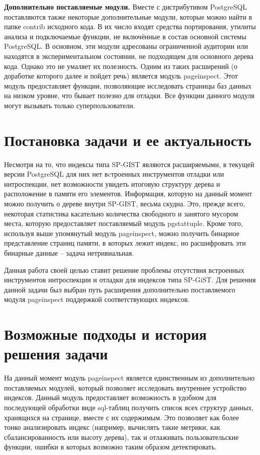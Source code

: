\documentclass[12pt,oneside]{amsart}
\begin{document}
\textbf{Дополнительно поставляемые модули.} Вместе с дистрибутивом PostgreSQL поставляются также некоторые дополнительные модули, которые можно найти в папке contrib исходного кода. В их число входят средства портирования, утилиты анализа и подключаемые функции, не включённые в состав основной системы PostgreSQL. В основном, эти модули адресованы ограниченной аудитории или находятся в экспериментальном состоянии, не подходящем для основного дерева кода. Однако это не умаляет их полезность. Одним из таких расширений (о доработке которого далее и пойдет речь) является модуль pageinspect. Этот модуль предоставляет функции, позволяющие исследовать страницы баз данных на низком уровне, что бывает полезно для отладки. Все функции данного модуля могут вызывать только суперпользователи.

\section{Постановка задачи и ее актуальность}

Несмотря на то, что индексы типа SP-GIST являются расширяемыми, в текущей версии PostgreSQL для них нет вcтроенных инструментов отладки или интроспекции, нет возможности увидеть итоговую структуру дерева и расположение в памяти его элементов. Информация, которую на данный момент можно получить о дереве внутри SP-GIST, весьма скудна. Это, прежде всего, некоторая статистика касательно количества свободного и занятого мусором места, которую предоставляет поставляемый модуль pgstattuple. Кроме того, используя выше упомянутый модуль pageinspect, можно получить бинарное представление страниц памяти, в которых лежит индекс, но расшифровать эти бинарные данные -- задача нетривиальная.

Данная работа своей целью ставит решение проблемы отсутствия встроенных инструментов интроспекции и отладки для индексов типа SP-GiST. Для решения данной задачи был выбран путь расширения дополнительно поставляемого модуля pageinspect поддержкой соответствующих индексов.

\section{Возможные подходы и история решения задачи}

На данный момент модуль pageinspect является единственным из дополнительно поставляемых модулей, который позволяет исследовать внутреннее устройство индексов. Данный модуль предоставляет возможность в удобном для последующей обработки виде sql-таблиц получить список всех структур данных, хранящихся на странице, вместе с их содержимым. Это позволяет как более тонко анализировать индекс (например, вычислять такие метрики, как сбалансированность или высоту дерева), так и отлаживать пользовательские функции, ошибки в которых возможно таким образом детектировать.
\end{document}
